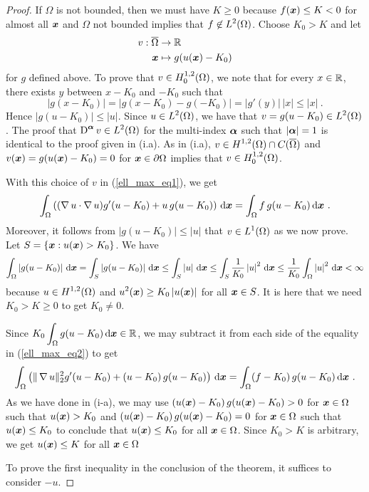 \begin{proof}
If $\Omega$ is not bounded, then we must have $K\geq 0$ because
$f({\bm{x}}) \leq K<0$ for almost all ${\bm{x}}$ and
$\Omega$ not bounded implies that $\displaystyle f \not\in L^2(\Omega)$.
Choose $K_0 > K$ and let
\begin{align*}
v: \overline{\Omega} & \rightarrow \mathbb{R} \\
{\bm{x}} &\mapsto g(u({\bm{x}})-K_0)
\end{align*}
for $g$ defined above.  To prove that $\displaystyle v\in H^{1,2}_0(\Omega)$, we
note that for every $x \in \mathbb{R}$, there exists $y$ between $x-K_0$ and
$-K_0$ such that
\[
\left|g(x-K_0)\right| = \left|g(x-K_0) - g(-K_0)\right| =
|g'(y)|\,|x| \leq |x| \ .
\]
Hence $|g(u-K_0)| \leq |u|$.  Since $\displaystyle u \in L^2(\Omega)$,
we have that $\displaystyle v = g(u-K_0) \in L^2(\Omega)$.  The proof that
$\displaystyle \operatorname{D}^{{\bm{\alpha}}} v \in L^2(\Omega)$ for the multi-index
${\bm{\alpha}}$ such that $|{\bm{\alpha}}|=1$ is identical to the proof
given in (i.a).
As in (i.a), $\displaystyle v\in H^{1,2}(\Omega) \cap C(\overline{\Omega})$ and
$v({\bm{x}}) = g(u({\bm{x}})-K_0) = 0$ for ${\bm{x}}\in \partial \Omega$
implies that $\displaystyle v\in H^{1,2}_0(\Omega)$.

With this choice of $v$ in (\ref{ell_max_eq1}), we get
\begin{equation} \label{ell_max_eq2}
\int_\Omega \left( (\operatorname{\nabla} u \cdot \operatorname{\nabla} u ) g'(u-K_0) 
+ u \, g(u-K_0) \right) \,\mathrm{d}{{\bm{x}}} = \int_\Omega f\,g(u-K_0)
\,\mathrm{d}{{\bm{x}}} \ .
\end{equation}
Moreover, it follows from $|g(u-K_0)| \leq |u|$ that
$\displaystyle v \in L^1(\Omega)$ as we now prove.  Let
$\displaystyle S = \left\{ {\bm{x}} : u({\bm{x}}) > K_0 \right\}$.  We
have
\[
\int_\Omega \left|g(u-K_0)\right| \,\mathrm{d}{{\bm{x}}}
= \int_S \left|g(u-K_0)\right| \,\mathrm{d}{{\bm{x}}}
\leq \int_S \left|u\right| \,\mathrm{d}{{\bm{x}}}
\leq \int_S \frac{1}{K_0} \left|u\right|^2 \,\mathrm{d}{{\bm{x}}}
\leq \frac{1}{K_0} \int_\Omega \left|u\right|^2 \,\mathrm{d}{{\bm{x}}} < \infty
\]
because $\displaystyle u \in H^{1,2}(\Omega)$ and
$\displaystyle u^2({\bm{x}})\geq K_0 \left|u({\bm{x}})\right|$ for all
${\bm{x}} \in S$.
It is here that we need $K_0>K\geq 0$ to get $K_0 \neq 0$.

Since $\displaystyle K_0 \int_\Omega g(u-K_0) \,\mathrm{d}{{\bm{x}}} \in \mathbb{R}$, we may
subtract it from each side of the equality in (\ref{ell_max_eq2}) to get
\[
\int_\Omega \left( \|\operatorname{\nabla} u\|_2^2 g'(u-K_0) 
+ (u-K_0) \, g(u-K_0) \right) \,\mathrm{d}{{\bm{x}}} = \int_\Omega (f-K_0)\,g(u-K_0)
\,\mathrm{d}{{\bm{x}}} \ .
\]
As we have done in (i-a), we may use
$(u({\bm{x}})-K_0) \, g(u({\bm{x}})-K_0) > 0$ for
${\bm{x}} \in \Omega$ such that $u({\bm{x}})>K_0$ and
$(u({\bm{x}})-K_0) \, g(u({\bm{x}})-K_0) = 0$ for
${\bm{x}} \in \Omega$ such that $u({\bm{x}})\leq K_0$ to conclude that
$u({\bm{x}}) \leq K_0$ for all ${\bm{x}}\in \Omega$.  Since $K_0>K$ is
arbitrary, we get $u({\bm{x}}) \leq K$ for all ${\bm{x}}\in \Omega$

 To prove the first inequality in the conclusion of the
theorem, it suffices to consider $-u$.
\end{proof}

